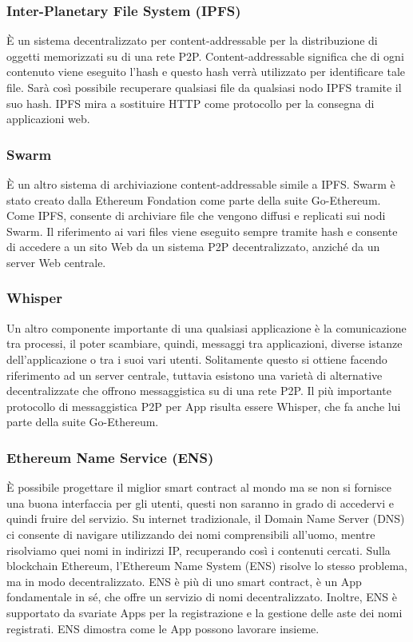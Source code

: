 \subsubsection{Inter-Planetary File System (IPFS)}
\`E un sistema decentralizzato per content-addressable per la distribuzione di oggetti memorizzati su di una rete P2P. Content-addressable significa che di ogni contenuto viene eseguito l'hash e questo hash verrà utilizzato per identificare tale file. Sarà così possibile recuperare qualsiasi file da qualsiasi nodo IPFS tramite il suo hash. IPFS mira a sostituire HTTP come protocollo per la consegna di applicazioni web.

\subsubsection{Swarm}
\`E un altro sistema di archiviazione content-addressable simile a IPFS. Swarm è stato creato dalla Ethereum Fondation come parte della suite Go-Ethereum. Come IPFS, consente di archiviare file che vengono diffusi e replicati sui nodi Swarm. Il riferimento ai vari files viene eseguito sempre tramite hash e consente di accedere a un sito Web da un sistema P2P decentralizzato, anziché da un server Web centrale.

\subsubsection{Whisper}
Un altro componente importante di una qualsiasi applicazione è la comunicazione tra processi, il poter scambiare, quindi, messaggi tra applicazioni, diverse istanze dell'applicazione o tra i suoi vari utenti. Solitamente questo si ottiene facendo riferimento ad un server centrale, tuttavia esistono una varietà di alternative decentralizzate che offrono messaggistica su di una rete P2P. Il più importante protocollo di messaggistica P2P per \DH App risulta essere Whisper, che fa anche lui parte della suite Go-Ethereum.

\subsubsection{Ethereum Name Service (ENS)}
\`E possibile progettare il miglior smart contract al mondo ma se non si fornisce una buona interfaccia per gli utenti, questi non saranno in grado di accedervi e quindi fruire del servizio. Su internet tradizionale, il Domain Name Server (DNS) ci consente di navigare utilizzando dei nomi comprensibili all'uomo, mentre risolviamo quei nomi in indirizzi IP, recuperando così i contenuti cercati. Sulla blockchain Ethereum, l'Ethereum Name System (ENS) risolve lo stesso problema, ma in modo decentralizzato. ENS è più di uno smart contract, è un \DH App fondamentale in sé, che offre un servizio di nomi decentralizzato. Inoltre, ENS è supportato da svariate \DH Apps per la registrazione e la gestione delle aste dei nomi registrati. ENS dimostra come le \DH App possono lavorare insieme. 

